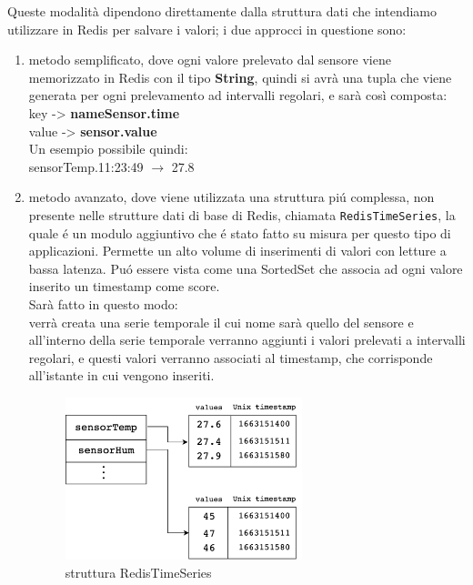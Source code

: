 Queste modalità dipendono direttamente dalla struttura dati che intendiamo utilizzare in Redis per salvare i valori;
i due approcci in questione sono:
\begin{enumerate}
    \item metodo semplificato, dove ogni valore prelevato dal sensore viene memorizzato in Redis con il tipo \textbf{String},
    quindi si avrà una tupla che viene generata per ogni prelevamento ad intervalli regolari, e sarà così composta:\\
    key -> \textbf{nameSensor.time}\\
    value -> \textbf{sensor.value} \\
    Un esempio possibile quindi:\\
    sensorTemp.11:23:49 $\to$ 27.8
    \item metodo avanzato, dove viene utilizzata una struttura piú complessa, non presente nelle strutture dati di base di Redis,
    chiamata \texttt{RedisTimeSeries}, la quale é un modulo aggiuntivo che é stato fatto su misura per questo tipo di applicazioni.
    Permette un alto volume di inserimenti di valori con letture a bassa latenza. Puó essere vista come una SortedSet che associa
    ad ogni valore inserito un timestamp come score.\\
    Sarà fatto in questo modo:\\
    verrà creata una serie temporale il cui nome sarà quello del sensore e all'interno della serie temporale verranno aggiunti i valori
    prelevati a intervalli regolari, e questi valori verranno associati al timestamp, che corrisponde
    all'istante in cui vengono inseriti.

    \begin{figure}[H]
        \begin{center}
            \includegraphics[width=0.65\textwidth]{img/redistimeseries}
        \end{center}
        \caption{struttura RedisTimeSeries}
    \end{figure} 
\end{enumerate}

